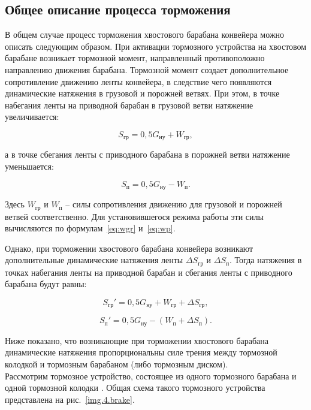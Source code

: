 \subsection{Общее описание процесса торможения} \label{subsect4_1_1}
В общем случае процесс торможения хвостового барабана конвейера можно описать следующим образом. При активации тормозного устройства на хвостовом барабане возникает тормозной момент, направленный противоположно направлению движения барабана. Тормозной момент создает дополнительное сопротивление движению ленты конвейера, в следствие чего появляются динамические натяжения в грузовой и порожней ветвях. При этом, в точке набегания ленты на приводной барабан в грузовой ветви натяжение увеличивается:

$$ S_{\text{гр}} = 0,5G_{\text{ну}} + W_{\text{гр}}, $$

а в точке сбегания ленты с приводного барабана в порожней ветви натяжение уменьшается:

$$ S_{\text{п}} = 0,5G_{\text{ну}} - W_{\text{п}}. $$

Здесь $ W_{\text{гр}} $ и $ W_{\text{п}} $ -- силы сопротивления движению для грузовой и порожней ветвей соответственно. Для установившегося режима работы эти силы вычисляются по формулам~\ref{eq:wgr} и~\ref{eq:wp}.

Однако, при торможении хвостового барабана конвейера возникают дополнительные динамические натяжения ленты $  \Delta S_{\text{гр}} $ и $  \Delta S_{\text{п}} $. Тогда натяжения в точках набегания ленты на приводной барабан и сбегания ленты с приводного барабана будут равны:

\begin{equation}
\label{eq:wt1}
S_{\text{гр}}' = 0,5G_{\text{ну}} + W_{\text{гр}} + \Delta S_{\text{гр}},
\end{equation}

\begin{equation}
\label{eq:wt2}
S_{\text{п}}' = 0,5G_{\text{ну}} - (W_{\text{п}} + \Delta S_{\text{п}}).
\end{equation}

Ниже показано, что возникающие при торможении хвостового барабана динамические натяжения пропорциональны силе трения между тормозной колодкой и тормозным барабаном (либо тормозным диском).\\

Рассмотрим тормозное устройство, состоящее из одного тормозного барабана и одной тормозной колодки \cite{maleksandrov1}. Общая схема такого тормозного устройства представлена на рис.~\ref{img.4.brake}.


